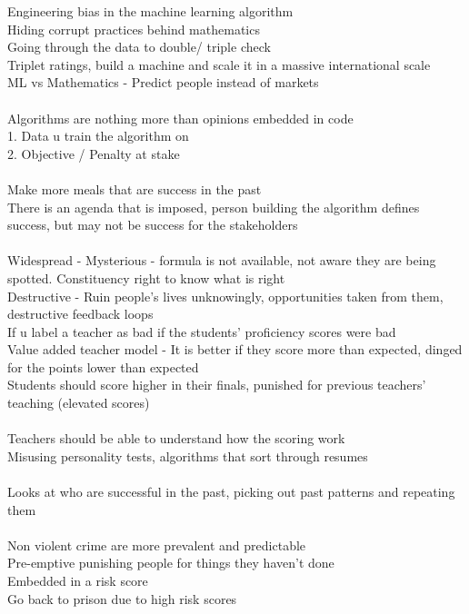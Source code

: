 \documentclass[11pt]{article}
\begin{document}
Engineering bias in the machine learning algorithm\\
Hiding corrupt practices behind mathematics\\
Going through the data to double/ triple check\\
Triplet ratings, build a machine and scale it in a massive international scale
\\
ML vs Mathematics - Predict people instead of markets\\
\\
Algorithms are nothing more than opinions embedded in code\\
1. Data u train the algorithm on\\
2. Objective / Penalty at stake\\
\\
Make more meals that are success in the past\\
There is an agenda that is imposed, person building the algorithm defines success, but may not be success for the stakeholders
\\
\\
Widespread - 
Mysterious - formula is not available, not aware they are being spotted. Constituency right to know what is right \\
Destructive - Ruin people's lives unknowingly, opportunities taken from them, destructive feedback loops
\\
If u label a teacher as bad if the students' proficiency scores were bad
\\
Value added teacher model - It is better if they score more than expected, dinged for the points lower than expected
\\
Students should score higher in their finals, punished for previous teachers' teaching (elevated scores)\\
\\
Teachers should be able to understand how the scoring work\\
Misusing personality tests, algorithms that sort through resumes\\
\\
Looks at who are successful in the past, picking out past patterns and repeating them\\
\\
Non violent crime are more prevalent and predictable
\\
Pre-emptive punishing people for things they haven't done\\
Embedded in a risk score\\
Go back to prison due to high risk scores\\
\end{document}
